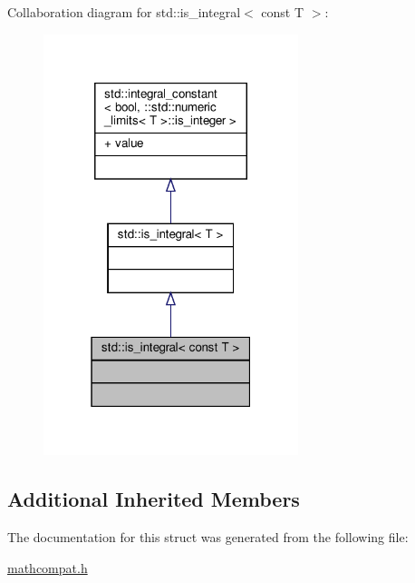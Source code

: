 Collaboration diagram for std\+:\+:is\+\_\+integral$<$ const T $>$\+:\nopagebreak
\begin{figure}[H]
\begin{center}
\leavevmode
\includegraphics[width=211pt]{dd/d57/structstd_1_1is__integral_3_01const_01T_01_4__coll__graph}
\end{center}
\end{figure}
\subsection*{Additional Inherited Members}


The documentation for this struct was generated from the following file\+:\begin{DoxyCompactItemize}
\item 
\hyperlink{mathcompat_8h}{mathcompat.\+h}\end{DoxyCompactItemize}
